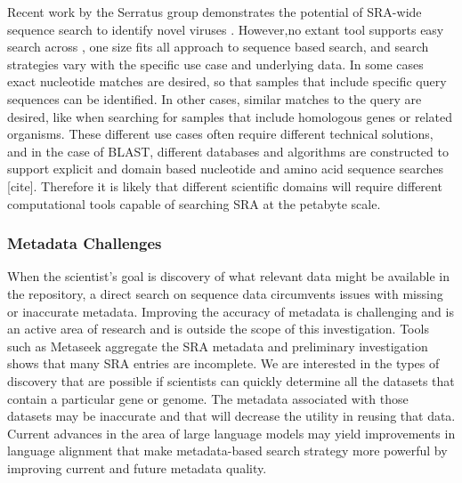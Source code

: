 Recent work by the Serratus group demonstrates the potential of SRA-wide sequence search to identify novel viruses \cite{edgar2022petabase}. However,no extant tool supports easy search across , one size fits all approach to sequence based search, and search strategies vary with the specific use case and underlying data. In some cases exact nucleotide matches are desired, so that samples that include specific query sequences can be identified. In other cases, similar matches to the query are desired, like when searching for samples that include homologous genes or related organisms. These different use cases often require different technical solutions, and in the case of BLAST, different databases and algorithms are constructed to support explicit and domain based nucleotide and amino acid sequence searches [cite]. Therefore it is likely that different scientific domains will require different computational tools capable of searching SRA at the petabyte scale.


\subsubsection{Metadata Challenges }
\label{sec:MetadataChallenges}

When the scientist’s goal is discovery of what relevant data might be available in the repository, a direct search on sequence data circumvents issues with missing or inaccurate metadata. Improving the accuracy of metadata is challenging and is an active area of research and is outside the scope of this investigation. Tools such as Metaseek aggregate the SRA metadata and preliminary investigation shows that many SRA entries are incomplete. We are interested in the types of discovery that are possible if scientists can quickly determine all the datasets that contain a particular gene or genome. The metadata associated with those datasets may be inaccurate and that will decrease the utility in reusing that data. Current advances in the area of large language models may yield improvements in language alignment that make metadata-based search strategy more powerful by improving current and future metadata quality. 

